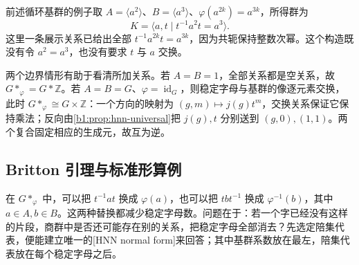 \ProseParagraphBreak
前述循环基群的例子取 \(A=\langle a^2\rangle\)、\(B=\langle a^3\rangle\)、\(\varphi(a^{2k})=a^{3k}\)，所得群为
\[
	K=\langle a,t\mid t^{-1}a^2t=a^3\rangle.
\]
这里一条展示关系已给出全部 \(t^{-1}a^{2k}t=a^{3k}\)，因为共轭保持整数次幂。这个构造既没有令 \(a^2=a^3\)，也没有要求 \(t\) 与 \(a\) 交换。

\ProseParagraphBreak
两个边界情形有助于看清所加关系。若 \(A=B=1\)，全部关系都是空关系，故 \(G*_{\varphi}=G*\mathbb Z\)。若 \(A=B=G\)、\(\varphi=\operatorname{id}_G\)，则稳定字母与基群的像逐元素交换，此时 \(G*_{\varphi}\cong G\times\mathbb Z\)：一个方向的映射为 \((g,m)\mapsto j(g)t^m\)，交换关系保证它保持乘法；反向由\cref{b1:prop:hnn-universal}把 \(j(g),t\) 分别送到 \((g,0),(1,1)\)。两个复合固定相应的生成元，故互为逆。

\subsection{Britton 引理与标准形算例}
\label{b1:subsec:C01:05}

在 \(G*_{\varphi}\) 中，可以把 \(t^{-1}at\) 换成 \(\varphi(a)\)，也可以把 \(tbt^{-1}\) 换成 \(\varphi^{-1}(b)\)，其中 \(a\in A,b\in B\)。这两种替换都减少稳定字母数。问题在于：若一个字已经没有这样的片段，商群中是否还可能存在别的关系，把稳定字母全部消去？先选定陪集代表，便能建立唯一的[HNN normal form]来回答；其中基群系数放在最左，陪集代表放在每个稳定字母之后。

